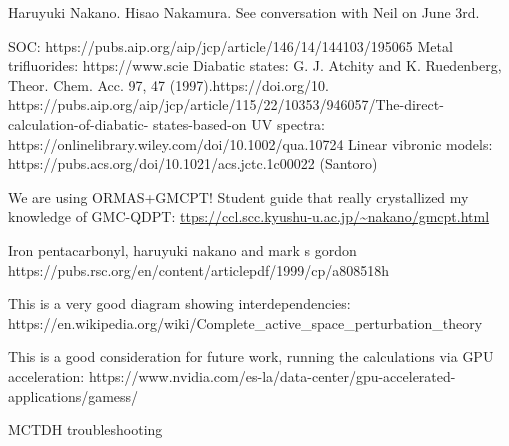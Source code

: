 \newpage

Haruyuki Nakano. Hisao Nakamura. See conversation with Neil on June 3rd.

SOC: https://pubs.aip.org/aip/jcp/article/146/14/144103/195065 Metal trifluorides: https://www.scie
Diabatic states: G. J. Atchity and K. Ruedenberg, Theor. Chem. Acc. 97, 47 (1997).https://doi.org/10.
https://pubs.aip.org/aip/jcp/article/115/22/10353/946057/The-direct-calculation-of-diabatic-
states-based-on
UV spectra: https://onlinelibrary.wiley.com/doi/10.1002/qua.10724
Linear vibronic models: https://pubs.acs.org/doi/10.1021/acs.jctc.1c00022 (Santoro)

We are using ORMAS+GMCPT! Student guide that really crystallized my knowledge of GMC-QDPT:
\url{ttps://ccl.scc.kyushu-u.ac.jp/~nakano/gmcpt.html}


    

Iron pentacarbonyl, haruyuki nakano and mark s gordon https://pubs.rsc.org/en/content/articlepdf/1999/cp/a808518h


This is a very good diagram showing interdependencies: https://en.wikipedia.org/wiki/Complete\_active\_space\_perturbation\_theory

This is a good consideration for future work, running the calculations via GPU acceleration: 
https://www.nvidia.com/es-la/data-center/gpu-accelerated-applications/gamess/

MCTDH troubleshooting

